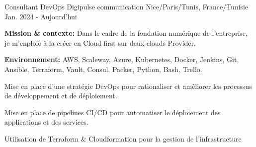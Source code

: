 
\begin{cventries}

\cventry
{Consultant DevOps} %
{Digipulse communication} %
{Nice/Paris/Tunis, France/Tunisie} %
{Jan. 2024 - Aujourd'hui} %
{
  \begin{cvitems} %
    \item {\textbf{Mission \& contexte:} Dans le cadre de la fondation numérique de l'entreprise, je m'enploie à la créer en Cloud first sur deux clouds Provider.}
    \item {\textbf{Environnement:} AWS, Scaleway, Azure, Kubernetes, Docker, Jenkins, Git, Ansible, Terraform, Vault, Consul, Packer, Python, Bash, Trello.}
    \item {Mise en place d'une stratégie DevOps pour rationaliser et améliorer les processus de développement et de déploiement.}
    \item {Mise en place de pipelines CI/CD pour automatiser le déploiement des applications et des services.}
    \item {Utilisation de Terraform \& Cloudformation pour la gestion de l'infrastructure}
  \end{cvitems}
}


\end{cventries}
